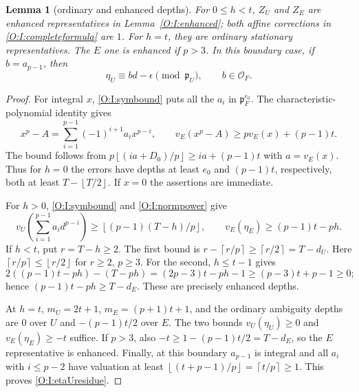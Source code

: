 \documentclass[11pt]{amsart}
\newtheorem{lemma}[theorem]{Lemma}
\theoremstyle{definition}
\theoremstyle{remark}
\newcommand{\ceil}[1]{\left\lceil #1\right\rceil}
\newcommand{\floor}[1]{\left\lfloor #1\right\rfloor}
\newcommand{\OO}{\mathcal O}\newcommand{\pp}{\mathfrak p}\newcommand{\PP}{\mathfrak P}
\begin{document}
\begin{lemma}[ordinary and enhanced depths]\label{O:I:normdepths}
For $0\le h<t$, $Z_U$ and $Z_E$ are enhanced representatives in
Lemma~\ref{O:I:enhanced}; both affine corrections in \eqref{O:I:completeformula}
are $1$.
For $h=t$, they are ordinary stationary representatives. The $E$ one is
enhanced if $p>3$. In this boundary case, if $b=a_{p-1}$, then
\begin{equation}\label{O:I:etaUresidue}
 \eta_U\equiv b d-\epsilon\pmod{\pp_U},\qquad b\in\OO_F.
\end{equation}
\end{lemma}
\begin{proof}
For integral $x$, \eqref{O:I:symbound} puts all the $a_i$ in $\pp_F^{e_0}$.
The characteristic-polynomial identity gives
\begin{equation}\label{O:I:normpower}
 x^p-A=\sum_{i=1}^{p-1}(-1)^{i+1}a_i x^{p-i},\qquad
 v_E(x^p-A)\ge p v_E(x)+(p-1)t.
\end{equation}
The bound follows from $p\floor{(ia+D_0)/p}\ge ia+(p-1)t$ with
$a=v_E(x)$. Thus for $h=0$ the errors have depths at least $e_0$ and
$(p-1)t$, respectively, both at least $T-\floor{T/2}$.
If $x=0$ the assertions are immediate.

For $h>0$, \eqref{O:I:symbound} and \eqref{O:I:normpower} give
\begin{equation}\label{O:I:errorsbounds}
 v_U\!\left(\sum_{i=1}^{p-1}a_i d^{p-i}\right)
 \ge\floor{(p-1)(T-h)/p},\qquad
 v_E(\eta_E)\ge(p-1)t-ph.
\end{equation}
If $h<t$, put $r=T-h\ge2$. The first bound is
$r-\ceil{r/p}\ge\ceil{r/2}=T-d_U$.
Here $\ceil{r/p}\le\floor{r/2}$ for $r\ge2$, $p\ge3$.
For the second, $h\le t-1$ gives
\[
 2((p-1)t-ph)-(T-ph)
 =(2p-3)t-ph-1\ge(p-3)t+p-1\ge0;
\]
hence $(p-1)t-ph\ge T-d_E$. These are precisely enhanced depths.

At $h=t$, $m_U=2t+1$, $m_E=(p+1)t+1$, and the ordinary ambiguity depths
are $0$ over $U$ and $-(p-1)t/2$ over $E$.
The two bounds $v_U(\eta_U)\ge0$ and $v_E(\eta_E)\ge-t$ suffice.
If $p>3$, also $-t\ge1-(p-1)t/2=T-d_E$, so the $E$ representative is
enhanced. Finally, at this boundary $a_{p-1}$ is integral and all
$a_i$ with $i\le p-2$ have valuation at least
$\floor{(t+p-1)/p}=\ceil{t/p}\ge1$. This proves \eqref{O:I:etaUresidue}.
\end{proof}
\end{document}
